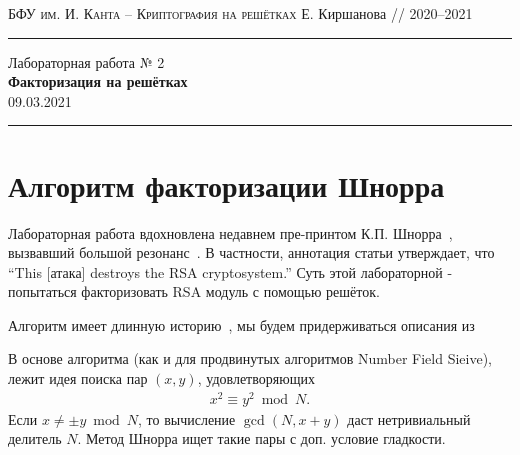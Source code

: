 \documentclass[11pt]{exam}
\theoremstyle{definition}
\begin{document}
	{\noindent
		\textsc{БФУ им. И. Канта -- Криптография на решётках}
		\hfill {Е. Киршанова // 2020--2021\\}
\hrule
\begin{center}
	{\LARGE
			Лабораторная работа № 2 \\[5pt]
			\textbf{Факторизация на решётках} \\[10pt]
	 	{09.03.2021} 
 	} 
\end{center}
\hrule \vspace{5mm}
	
	\thispagestyle{empty}
	
	\vspace{0.2cm}
	\section{Алгоритм факторизации Шнорра}
	
	Лабораторная работа вдохновлена недавнем пре-принтом К.П. Шнорра~\cite{Schnorr21}, вызвавший большой резонанс~\cite{twitter1,twitter2,stackexchange}. В частности, аннотация статьи утверждает, что ``This [атака] destroys the RSA cryptosystem.'' Суть этой лабораторной - попытаться факторизовать RSA модуль с помощью решёток. 
	
	Алгоритм имеет длинную историю~\cite{leogit}, мы будем придерживаться описания из~\cite{vera10}
	
	В основе алгоритма (как и для продвинутых алгоритмов Number Field Sieive), лежит идея поиска пар $(x,y)$, удовлетворяющих 
	\begin{align} \label{eq:congruence}
	x^2 \equiv y^2 \bmod N.
	\end{align}
	\noindent Если $x \neq \pm y \bmod N$, то вычисление $\gcd(N, x+y)$ даст нетривиальный делитель $N$. Метод Шнорра ищет такие пары с доп. условие гладкости.
	
}
\end{document}
